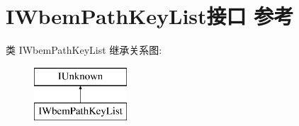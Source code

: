 \hypertarget{interface_i_wbem_path_key_list}{}\section{I\+Wbem\+Path\+Key\+List接口 参考}
\label{interface_i_wbem_path_key_list}
类 I\+Wbem\+Path\+Key\+List 继承关系图\+:\begin{figure}[H]
\begin{center}
\leavevmode
\includegraphics[height=2.000000cm]{interface_i_wbem_path_key_list}
\end{center}
\end{figure}
